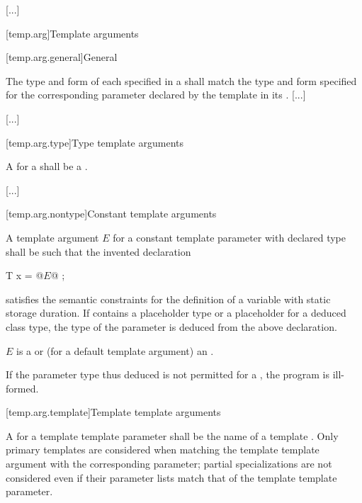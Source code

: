 \documentclass{wg21}
\begin{document}
\textcolor{noteclr}{[...]}


[temp.arg]{Template arguments}

[temp.arg.general]{General}


\pnum
{}
The type and form of each
specified in a
shall match the type and form specified for the corresponding
parameter declared by the template in its
.
\textcolor{noteclr}{[...]}

\textcolor{noteclr}{[...]}

[temp.arg.type]{Type template arguments}

\pnum
A
for a
shall be a
.

\textcolor{noteclr}{[...]}

[temp.arg.nontype]{Constant template arguments}

\pnum
A template argument $E$ for
a constant template parameter with declared type 
shall be such that the invented declaration
\begin{codeblock}
    T x = @$E$@ ;
\end{codeblock}
satisfies the semantic constraints for the definition of
a  variable with static storage duration.
If  contains a placeholder type
or a placeholder for a deduced class type,
the type of the parameter is deduced from the above declaration.
\begin{note}
    $E$ is a  or
    (for a default template argument) an .
\end{note}
If the parameter type thus deduced is not permitted
for a ,
the program is ill-formed.

[temp.arg.template]{Template template arguments}

\pnum A
for a template template parameter
shall be the name of a  template .
Only primary templates are considered when matching the template template
argument with the corresponding parameter; partial specializations are not
considered even if their parameter lists match that of the template template
parameter.
\end{document}
